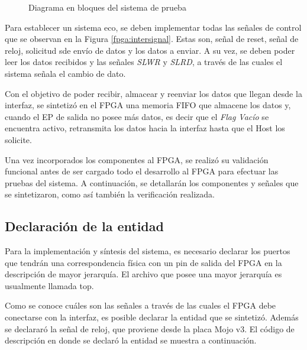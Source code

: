 \begin{figure}[ht]
	\caption{Diagrama en bloques del sistema de prueba}
	\label{test:sist}
\end{figure}

Para establecer un sistema eco, se deben implementar todas las señales de control que se observan en la Figura \ref{fpga:intersignal}. Estas son, señal de reset, señal de reloj, solicitud  sde envío de datos y los datos a enviar. A su vez, se deben poder leer los datos recibidos y las señales {\it SLWR} y {\it SLRD}, a través de las cuales el sistema señala el cambio de dato. 

Con el objetivo de poder recibir, almacear y reenviar los datos que llegan desde la interfaz, se sintetizó en el FPGA una memoria FIFO que almacene los datos y, cuando el EP de salida no posee más datos, es decir que el {\it Flag Vacío} se encuentra activo, retransmita los datos hacia la interfaz hasta que el Host los solicite.

Una vez incorporados los componentes al FPGA, se realizó su validación funcional antes de ser cargado todo el desarrollo al FPGA para efectuar las pruebas del sistema. A continuación, se detallarán los componentes y señales que se sintetizaron, como así también la verificación realizada.

\subsection{Declaración de la entidad}
	Para la implementación y síntesis del sistema, es necesario declarar los puertos que tendrán una correspondencia física con un pin de salida del FPGA en la descripción de mayor jerarquía. El archivo que posee una mayor jerarquía es usualmente llamada top.
	
	Como se conoce cuáles son las señales a través de las cuales el FPGA debe conectarse con la interfaz, es posible declarar la entidad que se sintetizó. Además se declararó  la señal de reloj, que proviene desde la placa Mojo v3. El código de descripción en donde se declaró la entidad se muestra a continuación.
	
